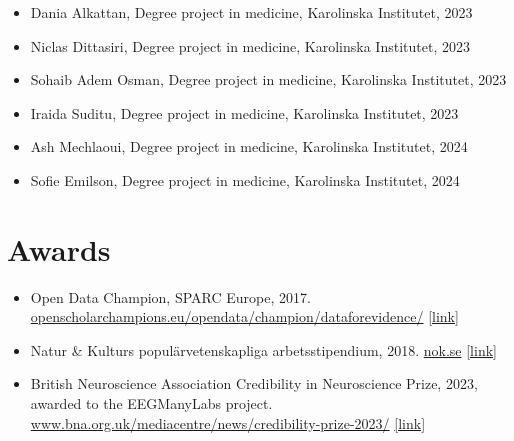 \documentclass[10pt,a4paper,twocolumn]{article}
\begin{document}
\begin{itemize}
\begin{itemize}
        \item Dania Alkattan, Degree project in medicine, Karolinska Institutet, 2023

        \item Niclas Dittasiri, Degree project in medicine, Karolinska Institutet, 2023

        \item Sohaib Adem Osman, Degree project in medicine, Karolinska Institutet, 2023

        \item Iraida Suditu, Degree project in medicine, Karolinska Institutet, 2023

        \item Ash Mechlaoui, Degree project in medicine, Karolinska Institutet, 2024

        \item Sofie Emilson, Degree project in medicine, Karolinska Institutet, 2024

    \end{itemize}


\end{itemize}



\section{Awards}
\begin{itemize}

    \item Open Data Champion, SPARC Europe, 2017. \href{https://openscholarchampions.eu/opendata/champion/dataforevidence/}{openscholarchampions.eu/opendata/champion/dataforevidence/} \href{https://openscholarchampions.eu/opendata/champion/dataforevidence/}{[link]}

    \item Natur \& Kulturs populärvetenskapliga arbetsstipendium, 2018. \href{https://nok.se}{nok.se} \href{https://www.nok.se/priser-och-stipendier/stipendier/popularvetenskapliga-arbetsstipendier/natur--kulturs-popularvetenskapliga-pris-2018/}{[link]}

    \item British Neuroscience Association Credibility in Neuroscience Prize, 2023, awarded to the EEGManyLabs project. \href{https://www.bna.org.uk/mediacentre/news/credibility-prize-2023/}{www.bna.org.uk/mediacentre/news/credibility-prize-2023/} \href{https://www.bna.org.uk/mediacentre/news/credibility-prize-2023/}{[link]}

\end{itemize}
\end{document}

